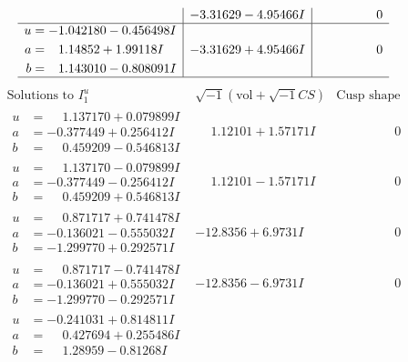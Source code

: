 \documentclass[1p]{elsarticle_modified}
\theoremstyle{definition}
\newcommand{\I}{\sqrt{-1}}
\begin{document}
$$\begin{array}{c|c|c}
 & -3.31629 - 4.95466 I & \phantom{-0.000000 } 0 \\ \hline\begin{aligned}
u &= -1.042180 - 0.456498 I \\
a &= \phantom{-}1.14852 + 1.99118 I \\
b &= \phantom{-}1.143010 - 0.808091 I\end{aligned}
 & -3.31629 + 4.95466 I & \phantom{-0.000000 } 0\\
 \hline 
 \end{array}$$\newpage$$\begin{array}{c|c|c}  
\text{Solutions to }I^u_{1}& \I (\text{vol} + \sqrt{-1}CS) & \text{Cusp shape}\\
 \hline 
\begin{aligned}
u &= \phantom{-}1.137170 + 0.079899 I \\
a &= -0.377449 + 0.256412 I \\
b &= \phantom{-}0.459209 - 0.546813 I\end{aligned}
 & \phantom{-}1.12101 + 1.57171 I & \phantom{-0.000000 } 0 \\ \hline\begin{aligned}
u &= \phantom{-}1.137170 - 0.079899 I \\
a &= -0.377449 - 0.256412 I \\
b &= \phantom{-}0.459209 + 0.546813 I\end{aligned}
 & \phantom{-}1.12101 - 1.57171 I & \phantom{-0.000000 } 0 \\ \hline\begin{aligned}
u &= \phantom{-}0.871717 + 0.741478 I \\
a &= -0.136021 - 0.555032 I \\
b &= -1.299770 + 0.292571 I\end{aligned}
 & -12.8356 + 6.9731 I & \phantom{-0.000000 } 0 \\ \hline\begin{aligned}
u &= \phantom{-}0.871717 - 0.741478 I \\
a &= -0.136021 + 0.555032 I \\
b &= -1.299770 - 0.292571 I\end{aligned}
 & -12.8356 - 6.9731 I & \phantom{-0.000000 } 0 \\ \hline\begin{aligned}
u &= -0.241031 + 0.814811 I \\
a &= \phantom{-}0.427694 + 0.255486 I \\
b &= \phantom{-}1.28959 - 0.81268 I\end{aligned}

\end{array}$$
\end{document}
